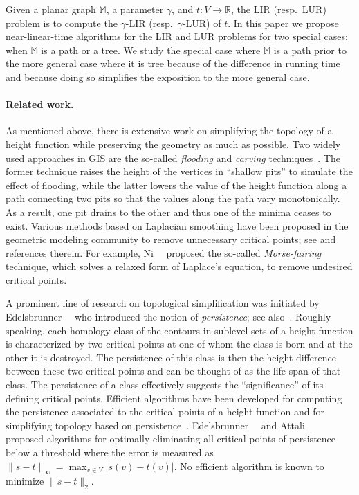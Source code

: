 \documentclass[11pt]{article}
\def\MM{\mathbb{M}}
\begin{document}
Given a planar graph $\MM$, a parameter $\gamma$, and 
$t: V \rightarrow \mathbb{R}$, the LIR (resp.\ LUR) problem
is to compute the $\gamma$-LIR (resp.\ $\gamma$-LUR) of $t$. In this 
paper we propose near-linear-time algorithms for the LIR and LUR problems
for two special cases: when $\MM$ is a path or a tree. We study the special case where $\MM$ is a path prior to the more general case where it is tree because of the difference in running time and because doing so simplifies the exposition to the more general case. 

\paragraph{Related work.}
As mentioned above, there is extensive work on simplifying the topology
of a height function while preserving the geometry as much as possible.
Two widely used approaches in GIS are the so-called \emph{flooding} and
\emph{carving} techniques~\cite{Agarwal:06,Danner:07,Soille:04a,Soille:04}. 
The former technique raises the height of 
the vertices in ``shallow pits'' to simulate the effect of flooding,
while the latter lowers the value of the height function along a 
path connecting two pits so that the values along the path 
vary monotonically. As a result, one pit drains to the other and 
thus one of the minima ceases to exist. 
Various methods based on Laplacian smoothing have been proposed in the 
geometric modeling community to remove unnecessary critical 
points; see \cite{Bajaj:98,Bremer:03,Guskov:01,Ni:04} and references therein.
For example, Ni~\etal~\cite{Ni:04} proposed
the so-called \emph{Morse-fairing} technique, which solves a 
relaxed form of Laplace's equation, to remove undesired 
critical points.

A prominent line of research on topological simplification was 
initiated by Edelsbrunner~\etal~\cite{Edelsbrunner:00,Edelsbrunner:03} who introduced the 
notion of \emph{persistence}; see also~\cite{Edelsbrunner:07,Zomorodian:05,Zomorodian:09}. 
Roughly speaking,  each homology class of the 
contours in sublevel sets of a height function is characterized by 
two critical points at one of whom the class is born and at the other it is destroyed. The persistence of this class is then the height difference between these two critical points and can be thought of as the life span of 
that class. The persistence of a class effectively suggests the ``significance'' of its defining critical points. 
Efficient algorithms have been developed for computing the persistence
associated to the critical points of a height function and for simplifying topology based on 
persistence~\cite{Edelsbrunner:03,Bremer:03}.
Edelsbrunner~\etal~\cite{Edelsbrunner:06} and Attali~\etal~\cite{Attali:08} proposed algorithms 
for optimally eliminating all critical points of persistence below a 
threshold where the error is measured as 
$\|s-t\|_\infty = \max_{v \in V} |s(v)-t(v)|$. No efficient 
algorithm is known to minimize $\|s-t\|_2$.
\end{document}
